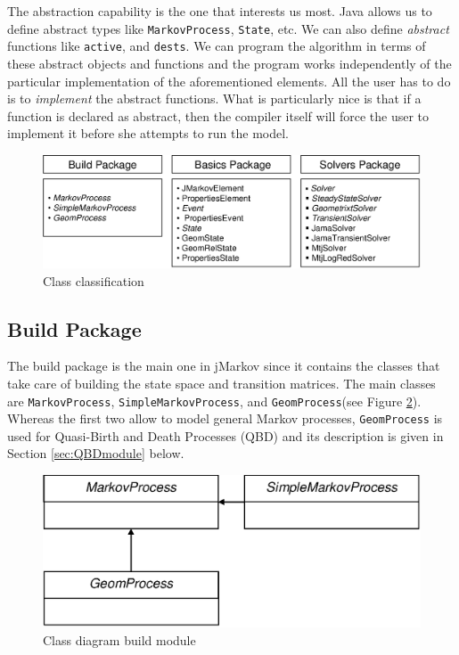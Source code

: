 \documentclass[11pt,letterpaper]{article}
\newcommand\SimpleMarkovProcess{\texttt{Simple\-Markov\-Pro\-cess}\xspace}
\newcommand\MarkovProcess{\texttt{Markov\-Pro\-cess}\xspace}
\newcommand\GeomProcess{\texttt{Geom\-Pro\-cess}\xspace}
\begin{document}
The abstraction capability is the one that interests us most.  Java allows us to
define abstract types like \MarkovProcess, \texttt{State}, etc.  We can also
define \emph{abstract} functions like \texttt{active}, and \texttt{dests}.  We
can program the algorithm in terms of these abstract objects and functions and
the program works independently of the particular implementation of the
aforementioned elements.  All the user has to do is to \textit{implement} the
abstract functions.  What is particularly nice is that if a function is declared
as abstract, then the compiler itself will force the user to implement it before
she attempts to run the model.


\begin{figure}[bt]
\centering
  \includegraphics[width=12cm]{pics/classClassification}
  \caption{Class classification}\label{fg:classClassification}
\end{figure}

\subsection{Build Package}\label{sc:BuildModule}

The build package is the main one in jMarkov since it contains the classes that
take care of building the state space and transition matrices.  The main classes
are \MarkovProcess, \SimpleMarkovProcess, and \GeomProcess (see Figure
\ref{fg:BuildModuleDiag}).  Wher\-eas the first two allow to model general
Markov processes, \GeomProcess is used for Quasi-Birth and Death Processes (QBD)
and its description is given in Section \ref{sec:QBDmodule} below.

\begin{figure}[htb]
  \centering
  \includegraphics[width=0.6\columnwidth]{pics/buildModuleDiag}
  \caption{Class diagram build module}\label{fg:BuildModuleDiag}
\end{figure}
\end{document}
